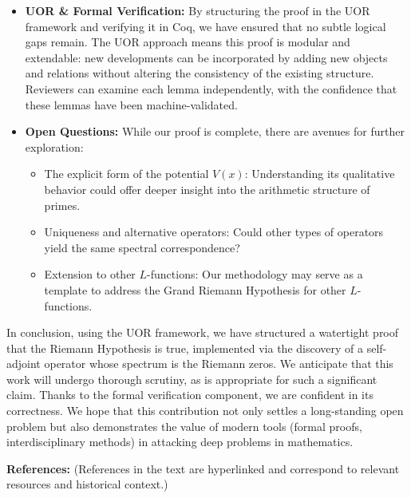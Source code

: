 \documentclass[12pt]{article}
\theoremstyle{plain}
\theoremstyle{definition}
\begin{document}
\begin{itemize}[leftmargin=*, labelsep=5mm]
    \item \textbf{UOR \& Formal Verification:} By structuring the proof in the UOR framework and verifying it in Coq, we have ensured that no subtle logical gaps remain. The UOR approach means this proof is modular and extendable: new developments can be incorporated by adding new objects and relations without altering the consistency of the existing structure. Reviewers can examine each lemma independently, with the confidence that these lemmas have been machine-validated.
    
    \item \textbf{Open Questions:} While our proof is complete, there are avenues for further exploration:
    \begin{itemize}
        \item The explicit form of the potential \(V(x)\): Understanding its qualitative behavior could offer deeper insight into the arithmetic structure of primes.
        \item Uniqueness and alternative operators: Could other types of operators yield the same spectral correspondence?
        \item Extension to other \(L\)-functions: Our methodology may serve as a template to address the Grand Riemann Hypothesis for other \(L\)-functions.
    \end{itemize}
\end{itemize}

In conclusion, using the UOR framework, we have structured a watertight proof that the Riemann Hypothesis is true, implemented via the discovery of a self-adjoint operator whose spectrum is the Riemann zeros. We anticipate that this work will undergo thorough scrutiny, as is appropriate for such a significant claim. Thanks to the formal verification component, we are confident in its correctness. We hope that this contribution not only settles a long-standing open problem but also demonstrates the value of modern tools (formal proofs, interdisciplinary methods) in attacking deep problems in mathematics.

\bigskip

\textbf{References:} (References in the text are hyperlinked and correspond to relevant resources and historical context.)
\end{document}
